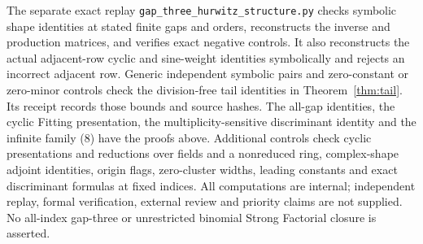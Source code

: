 \documentclass[11pt]{article}
\begin{document}
The separate exact replay
\texttt{gap\_three\_hurwitz\_structure.py} checks symbolic shape
identities at stated finite gaps and orders, reconstructs the inverse
and production matrices, and verifies exact negative controls.
It also reconstructs the actual adjacent-row cyclic and sine-weight
identities symbolically and rejects an incorrect adjacent row.
Generic independent symbolic pairs and zero-constant or zero-minor
controls check the division-free tail identities in Theorem~\ref{thm:tail}.
Its receipt records those bounds and source hashes.
The all-gap identities, the cyclic Fitting presentation, the
multiplicity-sensitive discriminant identity and the infinite family
(8) have the proofs above. Additional controls check cyclic
presentations and reductions over fields and a nonreduced ring,
complex-shape adjoint identities, origin flags, zero-cluster widths,
leading constants and exact discriminant formulas at fixed indices. All computations are internal; independent replay,
formal verification, external review and priority claims are not supplied.
No all-index gap-three or unrestricted binomial Strong Factorial
closure is asserted.
\end{document}
